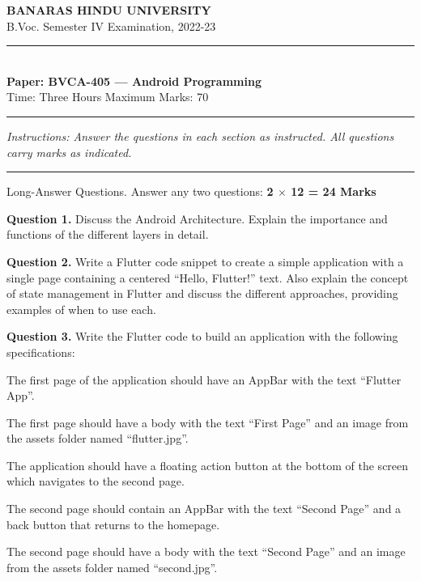 \documentclass[11pt,a4paper]{article}
\begin{document}
\begin{center}
  {\large\bfseries BANARAS HINDU UNIVERSITY}\\[2pt]
  {\normalsize B.Voc. Semester IV Examination, 2022-23}\\[6pt]
  \rule{0.8\linewidth}{0.5pt}\\[6pt]
  {\large\bfseries Paper: BVCA-405 --- Android Programming}\\[4pt]
  {\normalsize Time: Three Hours \hfill Maximum Marks: 70}
\end{center}

\rule{\linewidth}{0.4pt}

\smallskip



\noindent   \textit{Instructions: Answer the questions in each section as instructed. All questions carry marks as indicated.}

\bigskip




\rule{\linewidth}{0.4pt}\smallskip

Long-Answer Questions. Answer any two questions: \hfill   \textbf{2 $ \times$ 12 = 24 Marks}

\medskip



\noindent   \textbf{Question 1.} Discuss the Android Architecture. Explain the importance and functions of the different layers in detail.

\medskip



\noindent   \textbf{Question 2.} Write a Flutter code snippet to create a simple application with a single page containing a centered ``Hello, Flutter!'' text. Also explain the concept of state management in Flutter and discuss the different approaches, providing examples of when to use each.

\medskip



\noindent   \textbf{Question 3.} Write the Flutter code to build an application with the following specifications:

\begin{parts}
  \item The first page of the application should have an AppBar with the text ``Flutter App''.
  \item The first page should have a body with the text ``First Page'' and an image from the assets folder named ``flutter.jpg''.
  \item The application should have a floating action button at the bottom of the screen which navigates to the second page.
  \item The second page should contain an AppBar with the text ``Second Page'' and a back button that returns to the homepage.
  \item The second page should have a body with the text ``Second Page'' and an image from the assets folder named ``second.jpg''.
\end{parts}
\end{document}
